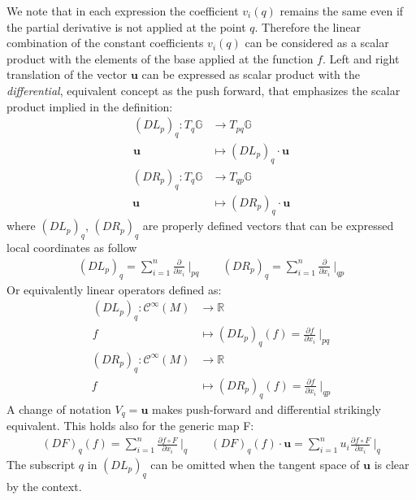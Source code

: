 We note that in each expression the coefficient $v_{i}(q)$ remains the same even if the partial derivative is not applied at the point $q$. Therefore the linear combination of the constant coefficients $v_{i}(q)$ can be considered as a scalar product with the elements of the base applied at the function $f$.
Left and right translation of the vector $\mathbf{u}$ can be expressed as scalar product with the \emph{differential}, equivalent concept as the push forward, that emphasizes the scalar product implied in the definition:
\begin{align*}
(DL_{p})_{q} : T_{q} \mathbb{G}& \longrightarrow  T_{pq}\mathbb{G}    \\
\mathbf{u} &\longmapsto  (DL_{p})_{q} \cdot \mathbf{u} 
\end{align*}
\begin{align*}
(DR_{p})_{q} : T_{q} \mathbb{G} & \longrightarrow  T_{qp}\mathbb{G}    \\
\mathbf{u} &\longmapsto  (DR_{p})_{q} \cdot \mathbf{u}
\end{align*}
where $(DL_{p})_{q}$, $(DR_{p})_{q}$ are properly defined vectors that can be expressed local coordinates as follow
\begin{align*}
(DL_{p})_{q} = \sum_{i=1}^{n}\frac{\partial }{\partial x_{i}} ~\Bigr|_{pq}
\qquad 
(DR_{p})_{q} = \sum_{i=1}^{n} \frac{\partial }{\partial x_{i}} ~\Bigr|_{qp}
\end{align*}
Or equivalently linear operators defined as:
\begin{align*}
(DL_{p})_{q} : \mathcal{C}^{\infty}(M) & \longrightarrow  \mathbb{R}   \\
 f &\longmapsto  (DL_{p})_{q} (f) = \frac{\partial f}{\partial x_{i}} ~\Bigr|_{pq} 
 \end{align*}
 \begin{align*}
(DR_{p})_{q} : \mathcal{C}^{\infty}(M) & \longrightarrow  \mathbb{R} \\
f &\longmapsto  (DR_{p})_{q} (f) = \frac{\partial f}{\partial x_{i}} ~\Bigr|_{qp}
\end{align*}
A change of notation $V_{q} = \mathbf{u}$ makes push-forward and differential strikingly equivalent. This holds also for the generic map F:
\begin{align*}
(DF)_{q} (f)= \sum_{i=1}^{n}\frac{\partial f\circ F}{\partial x_{i}} ~\Bigr|_{q}
\qquad
(DF)_{q} (f)\cdot \mathbf{u}  = \sum_{i=1}^{n} u_{i}\frac{\partial f\circ F}{\partial x_{i}} ~\Bigr|_{q}
\end{align*}
The subscript $q$ in $(DL_{p})_{q}$ can be omitted when the tangent space of $\mathbf{u}$ is clear by the context. 

